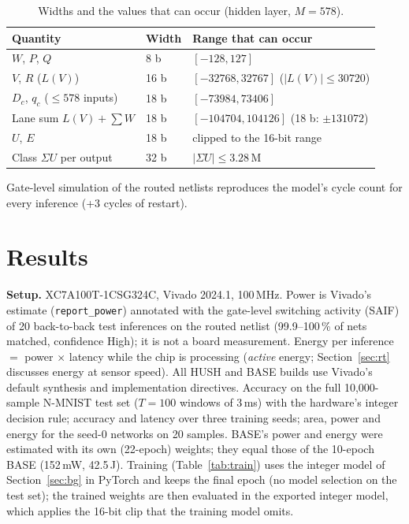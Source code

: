 \documentclass[conference]{IEEEtran}
\begin{document}
\begin{table}[t]\centering\caption{Widths and the values that can occur (hidden layer, $M=578$).}\label{tab:widths}
\setlength{\tabcolsep}{3pt}\footnotesize
\begin{tabular}{lll}\toprule
Quantity & Width & Range that can occur\\\midrule
$W$, $P$, $Q$ & 8 b & $[-128,127]$\\
$V$, $R$ ($L(V)$) & 16 b & $[-32768,32767]$ ($|L(V)|\le 30720$)\\
$D_c$, $q_c$ ($\le 578$ inputs) & 18 b & $[-73984,73406]$\\
Lane sum $L(V)+\sum W$ & 18 b & $[-104704,104126]$ (18 b: $\pm131072$)\\
$U$, $E$ & 18 b & clipped to the 16-bit range\\
Class $\Sigma U$ per output & 32 b & $|\Sigma U|\le 3.28\,$M\\\bottomrule
\end{tabular}\end{table} Gate-level simulation of the routed
netlists reproduces the model's cycle count for every inference (+3 cycles of restart).

\section{Results}\label{sec:res}
\textbf{Setup.} XC7A100T-1CSG324C, Vivado 2024.1, 100\,MHz. Power is Vivado's estimate (\texttt{report\_power})
annotated with the gate-level switching activity (SAIF) of 20 back-to-back test inferences on the routed netlist
(99.9--100\,\% of nets matched, confidence High); it is not a board measurement. Energy per inference $=$ power
$\times$ latency while the chip is processing (\emph{active} energy; Section~\ref{sec:rt} discusses energy at sensor speed).
All HUSH and BASE builds use Vivado's default synthesis and implementation directives.
Accuracy on the full 10,000-sample N-MNIST test set ($T=100$ windows of 3\,ms) with the hardware's integer decision
rule; accuracy and latency over three training seeds; area, power and energy for the seed-0 networks on 20 samples.
BASE's power and energy were estimated with its own (22-epoch) weights; they equal those of the 10-epoch BASE
(152\,mW, 42.5\,\textmu J). Training (Table~\ref{tab:train}) uses the integer model of Section~\ref{sec:bg} in PyTorch and
keeps the final epoch (no model selection on the test set); the trained weights are then evaluated in the exported
integer model, which applies the 16-bit clip that the training model omits.
\end{document}
